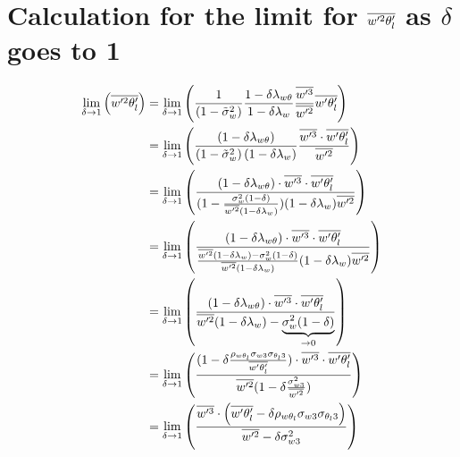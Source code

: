 \section{Calculation for the limit for \texorpdfstring{$\overline{w'^2 \theta_l'}$}{wprime2thetalprimebar} as \texorpdfstring{$\delta$}{delta} goes to 1}
\label{sec:calculation-for-the-limit-for-wprime2thetalprimebar-as-delta-goes-to-1}

\begin{align}
    \label{eq:limit_wprime2thetalbar_delta_to_1_calc}
    \lim_{\delta \to 1}\left(\overline{w'^2 \theta_l'}\right)
    &= \lim_{\delta \to 1}\left(
    \frac{1}{\left( 1 - \tilde{\sigma}_w^2 \right)}
    \frac{1 - \delta \lambda_{w\theta}}{1-\delta \lambda_w}
    \frac{\overline{w'^3}}{\overline{w'^2}} \overline{w'\theta_l'}
    \right)
    \\
    &= \lim_{\delta \to 1}\left(
    \frac{(1 - \delta \lambda_{w\theta})}
    {\left( 1 - \tilde{\sigma}_w^2 \right)(1-\delta \lambda_w)}
    \frac{\overline{w'^3} \cdot \overline{w'\theta_l'}}{\overline{w'^2}}
    \right)
    \\
    &= \lim_{\delta \to 1}\left(
    \frac{(1 - \delta \lambda_{w\theta}) \cdot \overline{w'^3} \cdot \overline{w'\theta_l'}}
    {(1 - \frac{\sigma_w^2 (1-\delta)}{\overline{w'^2}(1-\delta\lambda_w)})(1-\delta \lambda_w)\overline{w'^2}}
    \right)
    \\
    &= \lim_{\delta \to 1}\left(
    \frac{(1 - \delta \lambda_{w\theta}) \cdot \overline{w'^3} \cdot \overline{w'\theta_l'}}
    {\frac{\overline{w'^2}(1-\delta\lambda_w) - \sigma_w^2 (1-\delta)}
    {\overline{w'^2}(1-\delta\lambda_w)}
        (1-\delta \lambda_w) \overline{w'^2}}
    \right)
    \\
    &= \lim_{\delta \to 1}\left(
    \frac{(1 - \delta \lambda_{w\theta}) \cdot \overline{w'^3} \cdot \overline{w'\theta_l'}}
    {\overline{w'^2}(1-\delta\lambda_w) - \underbrace{\sigma_w^2 (1-\delta)}_{\to 0}}
    \right)
    \\
    &= \lim_{\delta \to 1}\left(
    \frac{(1 - \delta \frac{\rho_{w \theta_l} \sigma_{w 3} \sigma_{\theta_l 3}}{\overline{w' \theta_l'}}) \cdot \overline{w'^3} \cdot \overline{w'\theta_l'}}
    {\overline{w'^2}(1-\delta \frac{\sigma_{w 3}^2}{\overline{w'^2}})}
    \right)
    \\
    &= \lim_{\delta \to 1}\left(
    \frac{\overline{w'^3} \cdot \left(\overline{w'\theta_l'} - \delta \rho_{w \theta_l} \sigma_{w 3} \sigma_{\theta_l 3}\right)}
    {\overline{w'^2} - \delta \sigma_{w 3}^2}
    \right)
\end{align}